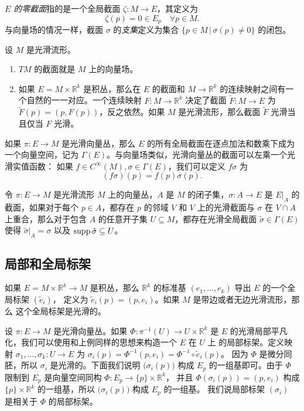 \emph{$E$ 的零截面}指的是一个全局截面 $\zeta:M\to E$，其定义为
\[
  \zeta(p)=0\in E_p\quad \forall p\in M.
\]
与向量场的情况一样，截面 $\sigma$ 的\emph{支集}定义为集合 $\{p\in M\,|\, \sigma(p)\neq 0\}$ 的闭包。

\begin{example}[向量丛的截面]
  设 $M$ 是光滑流形。
  \begin{enumerate}
    \item $TM$ 的截面就是 $M$ 上的向量场。
    \item 如果 $E=M\times \mathbb{R}^k$ 是积丛，那么在 $E$ 的截面和
    $M\to \mathbb{R}^k$ 的连续映射之间有一个自然的一一对应。一个连续映射 $F:M\to \mathbb{R}^k$
    决定了截面 $\tilde F:M\to E$ 为 $\tilde F(p)=(p,F(p))$，反之依然。如果 $M$
    是光滑流形，那么截面 $\tilde F$ 光滑当且仅当 $F$ 光滑。
  \end{enumerate}
\end{example}

如果 $\pi:E\to M$ 是光滑向量丛，那么 $E$ 的所有全局截面在逐点加法和数乘下成为一个向量空间，记为
$\Gamma(E)$。与向量场类似，光滑向量丛的截面可以左乘一个光滑实值函数：
如果 $f\in C^\infty(M),\sigma\in\Gamma(E)$，我们可以定义 $f\sigma$ 为
\[
  (f\sigma)(p)=f(p)\sigma(p).
\] 

\begin{lemma}[向量丛的延拓引理]
  令 $\pi:E\to M$ 是光滑流形 $M$ 上的向量丛，$A$ 是 $M$ 的闭子集，$\sigma:A\to E$
  是 $E|_A$ 的截面，如果对于每个 $p\in A$，都存在 $p$ 的邻域 $V$ 和
  $V$ 上的光滑截面与 $\sigma$ 在 $V\cap A$ 上重合，那么对于包含 $A$ 的任意开子集
  $U\subseteq M$，都存在光滑全局截面 $\tilde\sigma\in \Gamma(E)$ 使得
  $\tilde{\sigma}|_A=\sigma$ 以及 $\operatorname{supp}\tilde{\sigma}\subseteq U$。
\end{lemma}


\subsection{局部和全局标架}


\begin{example}[积丛的全局标架]
  如果 $E=M\times \mathbb{R}^k\to M$ 是积丛，那么 $\mathbb{R}^k$
  的标准基 $(e_1,\dots,e_k)$ 导出 $E$ 的一个全局标架 $(\tilde{e}_i)$，
  定义为 $\tilde{e}_i(p)=(p,e_i)$。如果 $M$ 是带边或者无边光滑流形，那么
  这个全局标架是光滑的。
\end{example}

\begin{example}[与局部平凡化相关的局部标架]
  设 $\pi:E\to M$ 是光滑向量丛。如果 $\varPhi:\pi^{-1}(U)\to U\times \mathbb{R}^k$
  是 $E$ 的光滑局部平凡化，我们可以使用和上例同样的思想来构造一个 $E$ 在 $U$ 上
  的局部标架。定义映射 $\sigma_1,\dots,\sigma_k:U\to E$ 为
  $\sigma_i(p)=\varPhi^{-1}(p,e_i)=\varPhi^{-1}\circ\tilde{e}_i(p)$。
  因为 $\varPhi$ 是微分同胚，所以 $\sigma_i$ 是光滑的。下面我们说明
  $\bigl(\sigma_i(p)\bigr)$ 构成 $E_p$ 的一组基即可。由于 $\varPhi$
  限制到 $E_p$ 是向量空间同构 $\varPhi:E_p\to \{p\}\times \mathbb{R}^k$，
  并且 $\varPhi(\sigma_i(p))=(p,e_i)$ 构成 $\{p\}\times\mathbb{R}^k$
  的一组基，所以 $\bigl(\sigma_i(p)\bigr)$ 构成 $E_p$ 的一组基。
  我们说局部标架 $(\sigma_i)$ 是相关于 $\varPhi$ 的局部标架。
\end{example}



